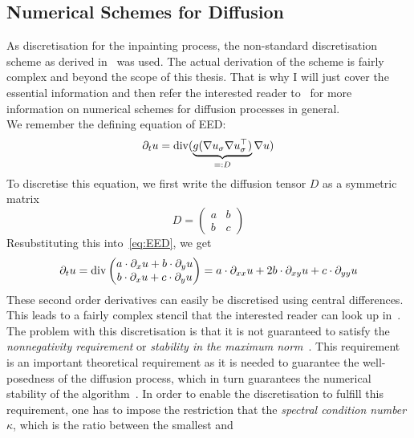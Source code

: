 \subsection{Numerical Schemes for Diffusion}\label{sub:NumSchemesDiffusion}
As discretisation for the inpainting process, the non-standard discretisation scheme as
derived in~\cite{www13} was used. The actual derivation of the scheme is fairly complex 
and beyond the scope of this thesis.
That is why I will just cover the essential information and then refer the interested 
reader to~\cite{weickert96, www13} for more information on numerical schemes for diffusion
processes in general.\\
We remember the defining equation of EED\@:
\begin{equation}
    \partial_t u = \operatorname{div}(\underbrace{g(\mathbf{\nabla} u_\sigma\mathbf{\nabla} u_\sigma^\top)}_{=:D}\mathbf{\nabla}
    u)\label{eq:EED}
\end{equation}
To discretise this equation, we first write the diffusion tensor $D$ as a symmetric matrix
\begin{equation}
    D = \begin{pmatrix}
        a&b\\b&c
    \end{pmatrix}
\end{equation}
Resubstituting this into~\eqref{eq:EED}, we get 
\begin{equation}
\partial_t u = \operatorname{div} \begin{pmatrix}
    a\cdot \partial_x u+b\cdot \partial_y u\\
    b\cdot \partial_x u+c\cdot \partial_y u
\end{pmatrix} = a\cdot\partial_{xx} u + 2b\cdot \partial_{xy}u+ c\cdot \partial_{yy} u
\end{equation}
These second order derivatives can easily be discretised using central differences. This leads to a
fairly complex stencil that the interested reader can look up in~\cite{weickert96}.
The problem with this discretisation is that it is not guaranteed to satisfy the
\textit{nonnegativity requirement} or \textit{stability in the maximum norm}~\cite{weickert96}. This requirement is
an important theoretical requirement as it is needed to guarantee the well-posedness of the
diffusion process, which in turn guarantees the numerical stability of the
algorithm~\cite{weickert96}.
In order to enable the discretisation to fulfill this requirement, one has to impose the restriction that
the \textit{spectral condition number $\kappa$}, which is the ratio between the smallest and
